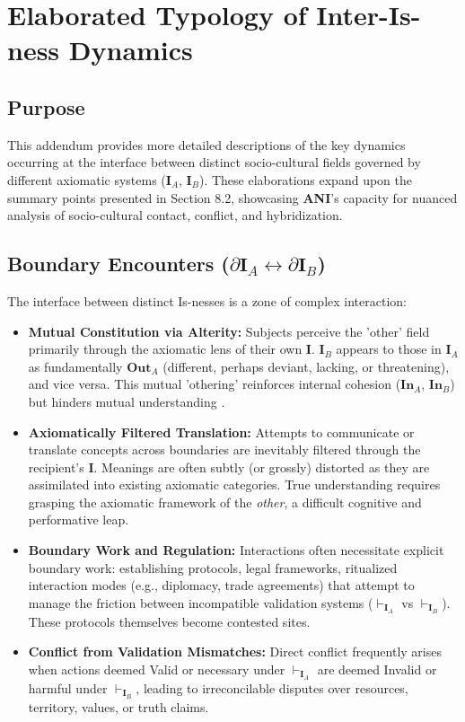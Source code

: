 \documentclass{article}
\newcommand{\ANI}{\textbf{ANI}}             %
\newcommand{\Isness}{\mathbf{I}}            %
\newcommand{\Inness}{\mathbf{In}}           %
\newcommand{\Outness}{\mathbf{Out}}         %
\newcommand{\validates}[1]{\ensuremath{\vdash_{#1}}} %
\newcommand{\boundary}[1]{\ensuremath{\partial #1}} %
\begin{document}
\section{Elaborated Typology of Inter-Is-ness Dynamics}

\subsection{Purpose}

This addendum provides more detailed descriptions of the key dynamics occurring at the interface between distinct socio-cultural fields governed by different axiomatic systems ($\Isness_A$, $\Isness_B$). These elaborations expand upon the summary points presented in Section 8.2, showcasing \ANI{}'s capacity for nuanced analysis of socio-cultural contact, conflict, and hybridization.

\subsection{Boundary Encounters ($\boundary{\Isness_A} \leftrightarrow \boundary{\Isness_B}$)}

The interface between distinct Is-nesses is a zone of complex interaction:
\begin{itemize}
    \item \textbf{Mutual Constitution via Alterity:} Subjects perceive the 'other' field primarily through the axiomatic lens of their own $\Isness$. $\Isness_B$ appears to those in $\Isness_A$ as fundamentally $\Outness_A$ (different, perhaps deviant, lacking, or threatening), and vice versa. This mutual 'othering' reinforces internal cohesion ($\Inness_A$, $\Inness_B$) but hinders mutual understanding \citep{Geertz1973}.
    \item \textbf{Axiomatically Filtered Translation:} Attempts to communicate or translate concepts across boundaries are inevitably filtered through the recipient's $\Isness$. Meanings are often subtly (or grossly) distorted as they are assimilated into existing axiomatic categories. True understanding requires grasping the axiomatic framework of the \textit{other}, a difficult cognitive and performative leap.
    \item \textbf{Boundary Work and Regulation:} Interactions often necessitate explicit boundary work: establishing protocols, legal frameworks, ritualized interaction modes (e.g., diplomacy, trade agreements) that attempt to manage the friction between incompatible validation systems ($\validates{\Isness_A}$ vs $\validates{\Isness_B}$). These protocols themselves become contested sites.
    \item \textbf{Conflict from Validation Mismatches:} Direct conflict frequently arises when actions deemed Valid or necessary under $\validates{\Isness_A}$ are deemed Invalid or harmful under $\validates{\Isness_B}$, leading to irreconcilable disputes over resources, territory, values, or truth claims.
\end{itemize}
\end{document}
